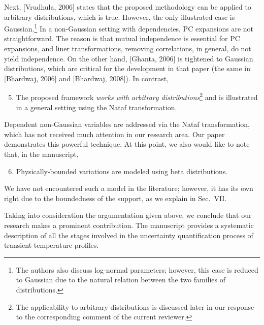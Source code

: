 \begin{authors}
Next, [Vrudhula, 2006] states that the proposed methodology can be applied to arbitrary distributions, which is true.
However, the only illustrated case is Gaussian.\footnote{The authors also discuss log-normal parameters; however, this case is reduced to Gaussian due to the natural relation between the two families of distributions.}
In a non-Gaussian setting with dependencies, PC expansions are not straightforward.
The reason is that mutual independence is essential for PC expansions, and liner transformations, removing correlations, in general, do not yield independence.
On the other hand, [Ghanta, 2006] is tightened to Gaussian distributions, which are critical for the development in that paper (the same in [Bhardwaj, 2006] and [Bhardwaj, 2008]).
In contrast,
\begin{enumerate}
  \setcounter{enumi}{4}
  \item The proposed framework \emph{works with arbitrary distributions}\footnote{The applicability to arbitrary distributions is discussed later in our response to the corresponding comment of the current reviewer.} and is illustrated in a general setting using the Nataf transformation.
\end{enumerate}
Dependent non-Gaussian variables are addressed via the Nataf transformation, which has not received much attention in our research area.
Our paper demonstrates this powerful technique.
At this point, we also would like to note that, in the manuscript,
\begin{enumerate}
  \setcounter{enumi}{5}
  \item Physically-bounded variations are modeled using beta distributions.
\end{enumerate}
We have not encountered such a model in the literature; however, it has its own right due to the boundedness of the support, as we explain in Sec.~VII.

Taking into consideration the argumentation given above, we conclude that our research makes a prominent contribution.
The manuscript provides a systematic description of all the stages involved in the uncertainty quantification process of transient temperature profiles.




\end{authors}


